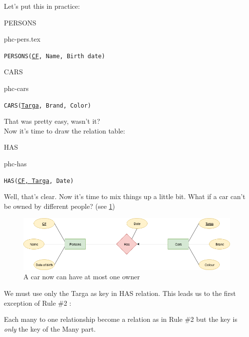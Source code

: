 \documentclass[class=book, crop=false, oneside]{standalone}
\begin{document}
Let's put this in practice:
\vskip 20pt
\begin{minipage}{0.45\textwidth}
	PERSONS
	\begin{table}[H]
		\centering
		{phc-pers.tex}
	\end{table}
	\texttt{PERSONS(\underline{CF}, Name, Birth date)}
\end{minipage}
\hspace{.1\textwidth}
\begin{minipage}{.45\textwidth}
	CARS
	\begin{table}[H]
		\centering
		{phc-cars}
	\end{table}
	\texttt{CARS(\underline{Targa}, Brand, Color)}
\end{minipage}
\vskip 20pt
That was pretty easy, wasn't it?\\
Now it's time to draw the relation table:
\vskip 20pt
\begin{minipage}{.7\textwidth}
	HAS
	\begin{table}[H]
		{phc-has}
	\end{table}
	\texttt{HAS(\underline{CF, Targa}, Date)}
\end{minipage}
\vskip 20pt
Well, that's clear. Now it's time to mix things up a little bit.
What if a car can't be owned by different people? (see \ref{diagram1_01})
\begin{figure}[H]
	\centering
	\includegraphics[width=\textwidth,keepaspectratio]{diagram1_01.png}
	\caption{A car now can have at most one owner}
	\label{diagram1_01}
\end{figure}
We must use only the Targa as key in HAS relation. This leads us to the first exception of Rule \#2	:

Each many to one relationship become a relation as in Rule \#2 but the key is \emph{only} the key of the Many part.
\end{document}
